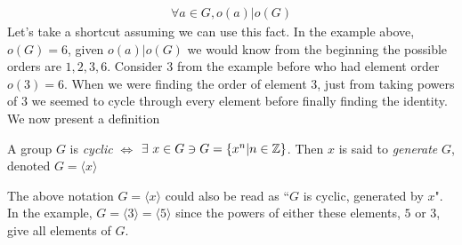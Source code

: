 \begin{align}
    \forall a \in G, o(a)|o(G) \nonumber
\end{align}
Let's take a shortcut assuming we can use this fact. In the example above, $o(G)=6$, given $o(a)|o(G)$ we would know from the beginning the possible orders are $1,2,3,6$. Consider $3$ from the example before who had element order $o(3)=6$. When we were finding the order of element $3$, just from taking powers of 3 we seemed to cycle through every element before finally finding the identity. We now present a definition 
\begin{definition}
A group $G$ is \textit{cyclic} $\iff$ $\exists \ x\in G \ni G=\{x^n|n\in {\mathbb{ Z}}\}$. Then $x$ is said to \textit{generate} $G$, denoted $G=\langle x \rangle$
\end{definition}
The above notation $G=\langle x \rangle$ could also be read as ``$G$ is cyclic, generated by $x$". \steezybreak\\
In the example, $G=\langle 3 \rangle=\langle 5 \rangle$ since the powers of either these elements, $5$ or $3$, give all elements of $G$.

